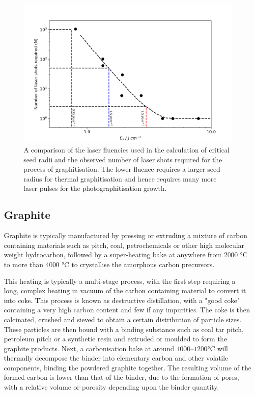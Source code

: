 \begin{refsection}
\begin{figure}
	\centering
	\includegraphics[width=\linewidth]{Chapter2/Figs/Raster/comparisonshots.png}
	\caption{A comparison of the laser fluencies used in the calculation of critical seed radii and the observed number of laser shots required for the process of graphitisation. The lower fluence requires a larger seed radius for thermal graphitisation and hence requires many more laser pulses for the photographitisation growth.}
	\label{fig:comparisonshots}
\end{figure}

\subsection{Graphite}
Graphite is typically manufactured by pressing or extruding a mixture of carbon containing materials such as pitch, coal, petrochemicals or other high molecular weight hydrocarbon, followed by a super-heating bake at anywhere from 2000 \si{\degreeCelsius} to more than 4000 \si{\degreeCelsius} to crystallise the amorphous carbon precursors. 

This heating is typically a multi-stage process, with the first step requiring a long, complex heating in vacuum of the carbon containing material to convert it into coke. This process is known as destructive distillation, with a "good coke" containing a very high carbon content and few if any impurities. The coke is then calcinated, crushed and sieved to obtain a certain distribution of particle sizes. These particles are then bound with a binding substance such as coal tar pitch, petroleum pitch or a synthetic resin and extruded or moulded to form the graphite products. Next, a carbonisation bake at around $1000\text{--}1200\si{\degreeCelsius}$ will thermally decompose the binder into elementary carbon and other volatile components, binding the powdered graphite together. The resulting volume of the formed carbon is lower than that of the binder, due to the formation of pores, with a relative volume or porosity depending upon the binder quantity.


\end{refsection}
